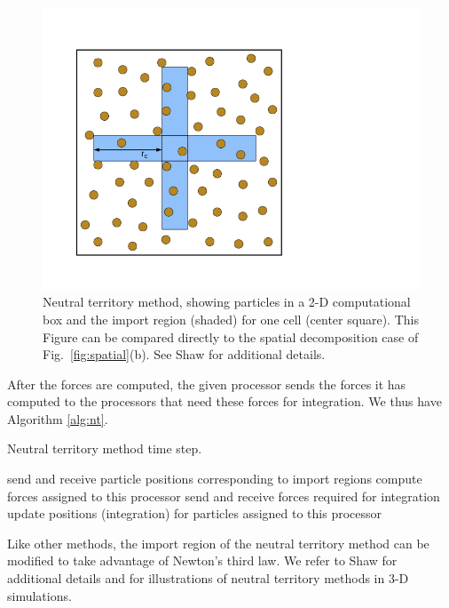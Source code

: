 \begin{figure}[htb]
\begin{center}
\includegraphics[clip=true,viewport=70 70 506 506,scale=.40]{mdchapter/fig-ntmethod}
\caption{Neutral territory method, showing particles in a 2-D computational box
and the import region (shaded) for one cell (center square).  This Figure can
be compared directly to the spatial decomposition case of Fig.~\ref{fig:spatial}(b).
See Shaw \cite{shaw} for additional details.}
\label{fig:nt}
\end{center}
\end{figure}

After the forces are computed, the given processor sends the forces
it has computed to the processors that need these forces for integration.
We thus have Algorithm \ref{alg:nt}.
\begin{algorithm}
\caption{Neutral territory method time step.}
\label{alg:nt}
\begin{algorithmic}[1]
\STATE send and receive particle positions corresponding to import regions
\STATE compute forces assigned to this processor
\STATE send and receive forces required for integration
\STATE update positions (integration) for particles assigned to this processor
\end{algorithmic}
\end{algorithm}

Like other methods, the import region of the neutral territory method can 
be modified to take advantage of Newton's third law.  We refer to
Shaw \cite{shaw} for additional details and for illustrations of neutral
territory methods in 3-D simulations.

